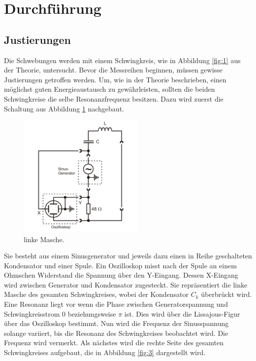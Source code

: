 \section{Durchführung}
\label{sec:Durchführung}








\subsection{Justierungen}
\label{sec:d0}
Die Schwebungen werden mit einem Schwingkreis, wie in Abbildung \ref{fig:1} aus der Theorie, untersucht.
Bevor die Messreihen beginnen, müssen gewisse Justierungen getroffen werden.
Um, wie in der Theorie beschrieben, einen möglichst guten Energieaustausch zu gewährleisten, sollten die beiden Schwingkreise die selbe Resonanzfrequenz besitzen.
Dazu wird zuerst die Schaltung aus Abbildung \ref{fig:2} nachgebaut.

\begin{figure}[H]
  \centering
  \includegraphics[height=6cm]{just1.png}
  \caption{linke Masche. \cite{sample}}
  \label{fig:2}
\end{figure}

Sie besteht aus einem Sinusgenerator und jeweils dazu einen in Reihe geschalteten Kondensator und einer Spule.
Ein Oszilloskop misst nach der Spule an einem Ohmschen Widerstand die Spannung über den Y-Eingang.
Dessen X-Eingang wird zwischen Generator und Kondensator zugesteckt.
Sie repräsentiert die linke Masche des gesamten Schwingkreises, wobei der Kondensator $C_k$ überbrückt wird.\\
Eine Resonanz liegt vor wenn die Phase zwischen Generatorspannung und Schwingkreisstrom 0 beziehungsweise $\pi$ ist.
Dies wird über die Lissajous-Figur über das Oszilloskop bestimmt.
Nun wird die Frequenz der Sinusspannung solange variiert, bis die Resonanz des Schwingkreises beobachtet wird.
Die Frequenz wird vermerkt.
Als nächstes wird die rechte Seite des gesamten Schwingkreises aufgebaut, die in Abbildung \ref{fig:3} dargestellt wird.

